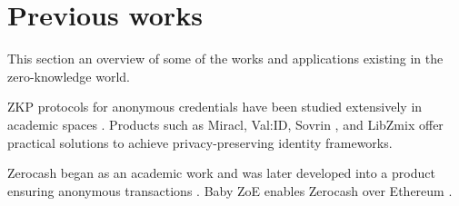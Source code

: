 \section{Previous works}
\label{apps:previous-works}

This section  an overview of some of the works and applications existing in the zero-knowledge world. 


	ZKP protocols for anonymous credentials have been studied extensively in academic spaces 
\cite{2010:SCN:Solving-Revocation-with-Efficient-Update-of-Anonymous-Credentials,
			2014:architecture-for-ABC-technologies,
			2017:ccs:Practical-UC-Secure-Delegatable-Credentials-with-attributes,
			2017:SP:Accumulators-with-Applications-to-Anonymity-Preserving-Revocation,
			2018:NSDI:zkLedger}.  
Products such as Miracl, Val:ID, Sovrin \cite{2018:sovrin}, and LibZmix \cite{2019:github:libzmix} offer practical solutions to achieve privacy-preserving identity frameworks.  

Zerocash began as an academic work and was later developed into a product ensuring anonymous transactions \cite{2014:SP:Zerocash}. 
Baby ZoE enables Zerocash over Ethereum \cite{2018:github:baby-zoe}.

